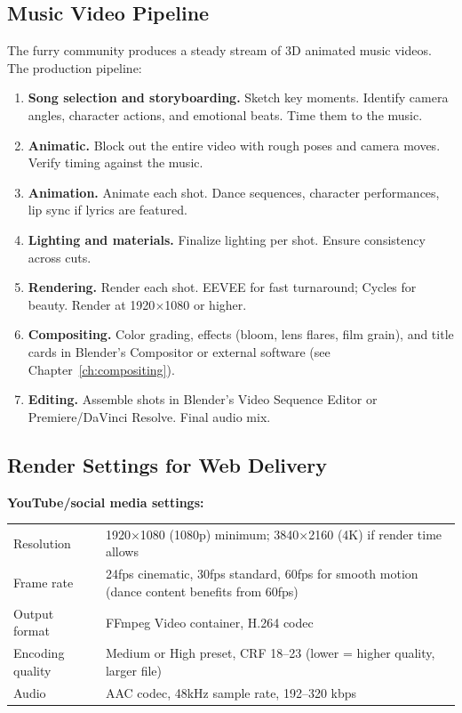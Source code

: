 \subsection{Music Video Pipeline}

The furry community produces a steady stream of 3D animated music videos. The production pipeline:

\begin{enumerate}[leftmargin=2em]
  \item \textbf{Song selection and storyboarding.} Sketch key moments. Identify camera angles, character actions, and emotional beats. Time them to the music.
  \item \textbf{Animatic.} Block out the entire video with rough poses and camera moves. Verify timing against the music.
  \item \textbf{Animation.} Animate each shot. Dance sequences, character performances, lip sync if lyrics are featured.
  \item \textbf{Lighting and materials.} Finalize lighting per shot. Ensure consistency across cuts.
  \item \textbf{Rendering.} Render each shot. EEVEE for fast turnaround; Cycles for beauty. Render at 1920$\times$1080 or higher.
  \item \textbf{Compositing.} Color grading, effects (bloom, lens flares, film grain), and title cards in Blender's Compositor or external software (see Chapter~\ref{ch:compositing}).
  \item \textbf{Editing.} Assemble shots in Blender's Video Sequence Editor or Premiere/DaVinci Resolve. Final audio mix.
\end{enumerate}


\subsection{Render Settings for Web Delivery}

\textbf{YouTube/social media settings:}

\begin{center}
\begin{tabularx}{\textwidth}{L{3.5cm}X}
\toprule
{}
 &  \\
\midrule
Resolution & 1920$\times$1080 (1080p) minimum; 3840$\times$2160 (4K) if render time allows \\
Frame rate & 24fps cinematic, 30fps standard, 60fps for smooth motion (dance content benefits from 60fps) \\
Output format & FFmpeg Video container, H.264 codec \\
Encoding quality & Medium or High preset, CRF 18--23 (lower = higher quality, larger file) \\
Audio & AAC codec, 48kHz sample rate, 192--320 kbps \\
\bottomrule
\end{tabularx}
\end{center}

